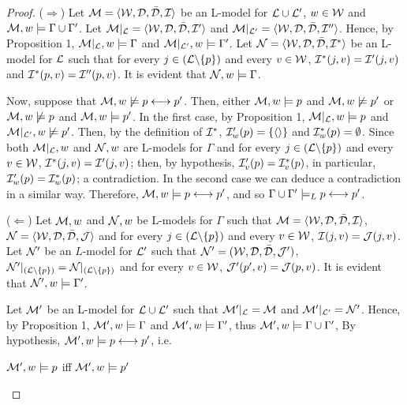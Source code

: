 \begin{proof}
($\Rightarrow$) Let $\mathcal{M} = \langle\mathcal{W},\mathcal{D}, \bar{\mathcal{D}},\mathcal{I}\rangle$ be an L-model for $\mathcal{L} \cup \mathcal{L}^{\prime}$, $w \in \mathcal{W}$ and $\mathcal{M},w \models \Gamma\cup \Gamma^{\prime}$. Let $\mathcal{M}|_{\mathcal{L}} = \langle \mathcal{W},\mathcal{D},\bar{\mathcal{D}},\mathcal{I}^{\prime}\rangle$ and $\mathcal{M}|_{\mathcal{L}^{\prime}} = \langle \mathcal{W},\mathcal{D},\bar{\mathcal{D}},\mathcal{I}^{\prime\prime}\rangle$. Hence, by Proposition 1,  $\mathcal{M}|_{\mathcal{L}},w \models \Gamma$ and $\mathcal{M}|_{\mathcal{L}^{\prime}},w \models \Gamma^{\prime}$. Let $\mathcal{N} = \langle\mathcal{W},\mathcal{D},\bar{\mathcal{D}},\mathcal{I}^{*}\rangle$ be an L-model for $\mathcal{L}$ such that for every $j \in (\mathcal{L} \backslash \{p\})$ and every $v \in \mathcal{W}$, $\mathcal{I}^{*}(j,v) = \mathcal{I}^{\prime}(j,v)$ and $\mathcal{I}^{*}(p,v) = \mathcal{I}^{\prime\prime}(p,v)$. It is evident that $\mathcal{N},w \models \Gamma$.

\qquad Now, suppose that $\mathcal{M},w \not\models p\longleftrightarrow p^{\prime}$. Then, either $\mathcal{M},w \models p$ and $\mathcal{M},w \not\models p^{\prime}$ or $\mathcal{M},w \not\models p$ and $\mathcal{M},w \models p^{\prime}$. In the first case, by Proposition 1, $\mathcal{M}|_{\mathcal{L}},w \models p$ and $\mathcal{M}|_{\mathcal{L}^{\prime}},w \not\models p^{\prime}$. Then, by the definition of $\mathcal{I}^{*}$, $\mathcal{I}_{w}^{\prime}(p)= \{\langle \rangle\}$ and $\mathcal{I}_{w}^{*}(p)=\emptyset$. Since both $\mathcal{M}|_{\mathcal{L}},w$ and $\mathcal{N},w$ are L-models for $\Gamma$ and for every $j \in (\mathcal{L} \backslash \{p\})$ and every $v \in \mathcal{W}$, $\mathcal{I}^{*}(j,v) = \mathcal{I}^{\prime}(j,v)$; then, by hypothesis,  $\mathcal{I}_{v}^{\prime}(p)= \mathcal{I}_{v}^{*}(p)$, in particular, $\mathcal{I}_{w}^{\prime}(p)= \mathcal{I}_{w}^{*}(p)$; a contradiction. In the second case we can deduce a contradiction in a similar way. Therefore, $\mathcal{M},w \models p\longleftrightarrow p^{\prime}$, and so $\Gamma\cup \Gamma^{\prime} \models_{L} p\longleftrightarrow p^{\prime}$.    

\qquad ($\Leftarrow$) Let $\mathcal{M},w$ and $\mathcal{N},w$ be L-models for $\Gamma$ such that $\mathcal{M} = \langle\mathcal{W},\mathcal{D}, \bar{\mathcal{D}},\mathcal{I}\rangle$, $\mathcal{N} = \langle \mathcal{W},\mathcal{D},\bar{\mathcal{D}},\mathcal{J} \rangle$ and for every $j \in (\mathcal{L} \backslash \{p\})$ and every $v \in \mathcal{W}$, $\mathcal{I}(j,v) = \mathcal{J}(j,v)$. Let $\mathcal{N}^{\prime}$ be an $L$-model for $\mathcal{L}^{\prime}$ such that $\mathcal{N}^{\prime} = (\mathcal{W},\mathcal{D},\bar{\mathcal{D}},\mathcal{J}^{\prime})$, $\mathcal{N}^{\prime}|_{(\mathcal{L}\backslash\{p\})} =\mathcal{N}|_{(\mathcal{L}\backslash\{p\})}$ and for every $v \in \mathcal{W}$, $\mathcal{J}^{\prime}(p^{\prime},v) = \mathcal{J}(p,v)$. It is evident that $\mathcal{N}^{\prime},w \models \Gamma^{\prime}$.  

\qquad Let $\mathcal{M}^{\prime}$ be an L-model for $\mathcal{L} \cup \mathcal{L}^{\prime}$ such that $\mathcal{M}^{\prime}|_{\mathcal{L}} = \mathcal{M}$ and $\mathcal{M}^{\prime}|_{\mathcal{L}^{\prime}} = \mathcal{N}^{\prime}$. Hence, by Proposition 1,  $\mathcal{M}^{\prime},w \models \Gamma$ and $\mathcal{M}^{\prime},w \models \Gamma^{\prime}$, thus $\mathcal{M}^{\prime},w \models \Gamma \cup \Gamma^{\prime}$, By hypothesis, $\mathcal{M}^{\prime},w \models p \longleftrightarrow p^{\prime}$, i.e.    


\begin{center}
$\mathcal{M}^{\prime},w \models p$ iff $\mathcal{M}^{\prime},w \models p^{\prime}$ \\
\end{center} 



\end{proof}
